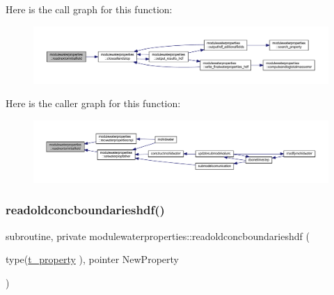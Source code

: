 Here is the call graph for this function\+:\nopagebreak
\begin{figure}[H]
\begin{center}
\leavevmode
\includegraphics[width=350pt]{namespacemodulewaterproperties_a70dce18437eed5f486027590c6d6a511_cgraph}
\end{center}
\end{figure}
Here is the caller graph for this function\+:\nopagebreak
\begin{figure}[H]
\begin{center}
\leavevmode
\includegraphics[width=350pt]{namespacemodulewaterproperties_a70dce18437eed5f486027590c6d6a511_icgraph}
\end{center}
\end{figure}
\mbox{\label{namespacemodulewaterproperties_ab37c7ef1af4bcefaf38220a0ce3fdf12}} 
\subsubsection{\texorpdfstring{readoldconcboundarieshdf()}{readoldconcboundarieshdf()}}
{\footnotesize\ttfamily subroutine, private modulewaterproperties\+::readoldconcboundarieshdf (\begin{DoxyParamCaption}\item[{type(\mbox{\hyperlink{structmodulewaterproperties_1_1t__property}{t\+\_\+property}} ), pointer}]{New\+Property }\end{DoxyParamCaption})\hspace{0.3cm}{\ttfamily [private]}}

